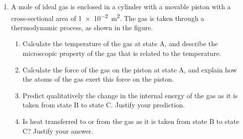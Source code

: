 \documentclass{../../oss-apphys}
\begin{document}
\begin{enumerate}[leftmargin=15pt]
\begin{enumerate}[leftmargin=18pt]
  \item A cube of lead with a side dimension of \SI{5.0}{cm} is slowly lowered
    into the beaker of oil by a thin string attached to a spring scale at a
    constant rate, as shown in the figure. The density of lead is
    \SI{11300}{kg/m^3}.
    \begin{center}
    \end{center}
    \begin{enumerate}
    \item What will be the spring scale reading in newtons when the lead has
      been submerged to location 2?
    \item Does the spring scale reading increase, decrease, or stay the
      same when the cube is lowered from location 2 to location 3?
      Justify your answer by referencing the pressure of the fluid on
      the lead cube.
    \item The lead cube is lowered from above the oil’s surface (location
      1) to a spot just below the surface (location 2) until the cube is
      just above the bottom of the beaker (location 3). Describe any
      changes in pressure on the bottom of the beaker during this
      process. Explain your answer.
    \end{enumerate}
  \end{enumerate}
  \newpage
  
\item A mole of ideal gas is enclosed in a cylinder with a movable piston
  with a cross-sectional area of \SI{1e-2}{m^2}. The gas is taken through a
  thermodynamic process, as shown in the figure.
  \begin{center}
  \end{center}
  \begin{enumerate}[leftmargin=18pt]
  \item Calculate the temperature of the gas at state A, and describe the
    microscopic property of the gas that is related to the
    temperature.
    \vspace{1in}
  \item Calculate the force of the gas on the piston at state A, and
    explain how the atoms of the gas exert this force on the piston.
    \vspace{1in}
  \item Predict qualitatively the change in the internal energy of the gas
    as it is taken from state B to state C. Justify your prediction.
    \vspace{1in}
  \item Is heat transferred to or from the gas as it is taken from state B to
    state C? Justify your answer.
    \newpage


\end{enumerate}
\end{enumerate}
\end{document}
